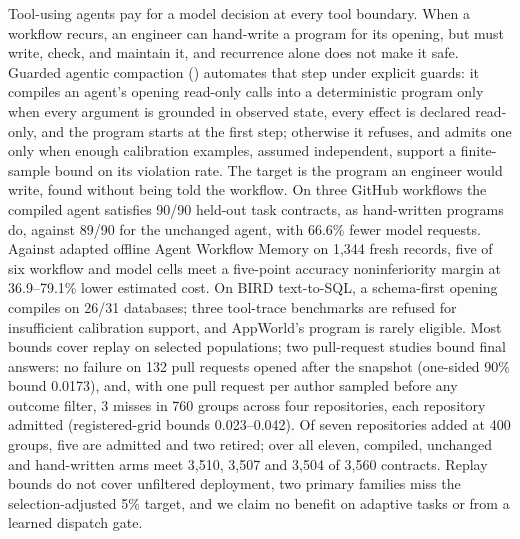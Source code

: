 Tool-using agents pay for a model decision at every tool boundary. When a
workflow recurs, an engineer can hand-write a program for its opening, but must
write, check, and maintain it, and recurrence alone does not make it safe.
Guarded agentic compaction (\method) automates that step under explicit guards: it compiles an
agent's opening read\nobreakdash-only calls into a
deterministic program only when every argument is grounded in observed state,
every effect is declared read\nobreakdash-only, and the program starts at the
first step; otherwise it refuses, and admits one only when enough calibration examples, assumed independent,
support a finite-sample bound on its violation rate. The target is the
program an engineer would write, found without being told the workflow. On three
GitHub workflows the compiled agent satisfies 90/90 held-out task contracts, as
hand-written programs do, against 89/90 for the unchanged agent, with 66.6\%
fewer model requests. Against
adapted offline Agent Workflow Memory on 1,344 fresh records, five of six
workflow and model cells meet a five-point accuracy noninferiority margin at
36.9--79.1\% lower estimated cost. On BIRD
text-to-SQL, a schema-first opening compiles on 26/31 databases; three tool-trace benchmarks are refused for
insufficient calibration support, and AppWorld's program is rarely eligible. Most
bounds cover replay on selected populations; two pull-request studies bound final
answers: no failure on 132 pull requests opened after the snapshot (one-sided 90\%
bound 0.0173), and, with one pull request per author sampled before any outcome
filter, 3 misses in 760 groups across four repositories,
each repository admitted (registered-grid bounds 0.023--0.042). Of seven
repositories added at 400 groups, five
are admitted and two retired; over all eleven, compiled, unchanged and hand-written
arms meet 3,510, 3,507 and 3,504 of 3,560 contracts.
Replay bounds do not cover unfiltered deployment, two primary families miss the
selection-adjusted 5\% target, and we claim no benefit on adaptive tasks or from
a learned dispatch gate.
